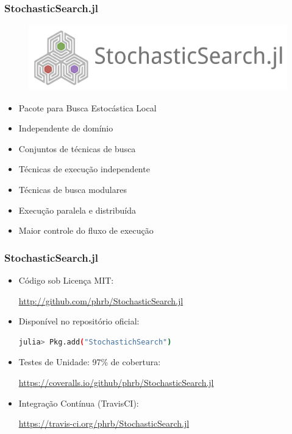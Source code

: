 \documentclass[10pt, compress]{beamer}
\begin{document}
\begin{frame}[fragile]
    \frametitle{StochasticSearch.jl}
    \begin{figure}[H]
        \centering
        \includegraphics[width=.7\textwidth]{stochasticsearchlogo}
    \end{figure}%
    \begin{itemize}
        \item Pacote para \alert{Busca Estocástica Local}
        \item \alert{Independente} de domínio
        \item \alert{Conjuntos} de técnicas de busca
            \pause
        \item Técnicas de execução \alert{independente}
        \item Técnicas de busca \alert{modulares}
            \pause
        \item Execução \alert{paralela} e \alert{distribuída}
            \pause
        \item Maior \alert{controle} do fluxo de execução
    \end{itemize}
\end{frame}

\begin{frame}[fragile]
    \frametitle{StochasticSearch.jl}
    \begin{itemize}
        \item Código sob Licença MIT:

            \url{http://github.com/phrb/StochasticSearch.jl}
        \item Disponível no \alert{repositório oficial}:
            \begin{lstlisting}[language=bash]
julia> Pkg.add("StochastichSearch")
            \end{lstlisting}
            \pause
        \item Testes de Unidade: \alert{97\%} de cobertura:

                \url{https://coveralls.io/github/phrb/StochasticSearch.jl}
        \item Integração Contínua (\alert{TravisCI}):

            \url{https://travis-ci.org/phrb/StochasticSearch.jl}
    \end{itemize}
\end{frame}
\end{document}
